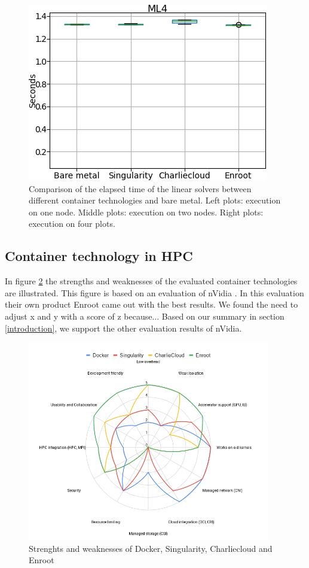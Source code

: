 \documentclass[conference]{IEEEtran}
\begin{document}
\begin{figure}
\centering
\includegraphics[width=\textwidth/3]{images/1.png}
\caption{Comparison of the elapsed time of the linear solvers between different container technologies and bare metal. Left plots: execution on one node. Middle plots: execution on two nodes. Right plots: execution on four plots.}
\label{fig:container_benchmarks}
\end{figure}


\subsection{Container technology in HPC}
In figure \ref{fig:container_tech} the strengths and weaknesses of the evaluated container technologies are illustrated. This figure is based on an evaluation of nVidia \cite{nvidia-slurm-containers}. In this evaluation their own product Enroot came out with the best results. We found the need to adjust x and y with a score of z because... Based on our summary in section \ref{introduction}, we support the other evaluation results of nVidia.

\begin{figure}
\centering
\includegraphics[width=400px]{images/container_tech.png}
\caption{Strenghts and weaknesses of Docker, Singularity, Charliecloud and Enroot}
\label{fig:container_tech}
\end{figure}
\end{document}
